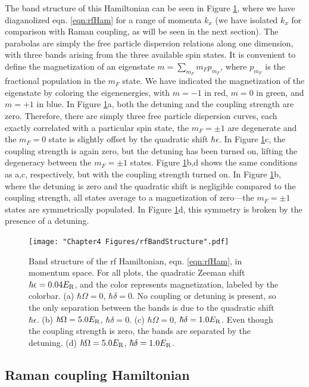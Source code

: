 The band structure of this Hamiltonian can be seen in Figure \ref{fig:RfBandStruct}, where we have diaganolized eqn. \ref{eqn:rfHam} for a range of momenta $k_x$ (we have isolated $k_x$ for comparison with Raman coupling, as will be seen in the next section). The parabolas are simply the free particle dispersion relations along one dimension, with three bands arising from the three available spin states. It is convenient to define the magnetization of an eigenstate $m = \sum_{m_F} m_F p_{m_F}$, where $p_{m_F}$ is the fractional population in the $m_F$ state. We have indicated the magnetization of the eigenstate by coloring the eigenenergies, with $m=-1$ in red, $m=0$ in green, and $m=+1$ in blue. In Figure \ref{fig:RfBandStruct}a, both the detuning and the coupling strength are zero. Therefore, there are simply three free particle dispersion curves, each exactly correlated with a particular spin state, the $m_F=\pm1$ are degenerate and the $m_F=0$ state is slightly offset by the quadratic shift $\hbar\epsilon$. In Figure \ref{fig:RfBandStruct}c, the coupling strength is again zero, but the detuning has been turned on, lifting the degeneracy between   the $m_F=\pm1$ states. Figure \ref{fig:RfBandStruct}b,d shows the same conditions as a,c, respectively, but with the coupling strength turned on. In Figure \ref{fig:RfBandStruct}b, where the detuning is zero and the quadratic shift is negligible compared to the coupling strength, all states average to a magnetization of zero---the $m_F=\pm1$ states are symmetrically populated. In Figure \ref{fig:RfBandStruct}d, this symmetry is broken by the presence of a detuning.  

\begin{figure}
	\texttt{[image: "Chapter4 Figures/rfBandStructure".pdf]}
\caption[Band structure of the rf Hamiltonian]{Band structure of the rf Hamiltonian, eqn. \ref{eqn:rfHam}, in momentum space. For all plots, the quadratic Zeeman shift $\hbar\epsilon = 0.04 E_{\rm R}$, and the color represents magnetization, labeled by the colorbar. (a) $\hbar\Omega=0$, $\hbar\delta = 0$. No coupling or detuning is present, so the only separation between the bands is due to the quadratic shift $\hbar\epsilon$. (b) $\hbar\Omega=5.0 E_{\rm R}$, $\hbar\delta = 0$. (c) $\hbar\Omega=0$, $\hbar\delta = 1.0 E_{\rm R}$. Even though the coupling strength is zero, the bands are separated by the detuning. (d) $\hbar\Omega=5.0 E_{\rm R}$, $\hbar\delta = 1.0 E_{\rm R}$.}
\label{fig:RfBandStruct}
\end{figure}

\subsection{Raman coupling Hamiltonian}\label{sec:Raman}

